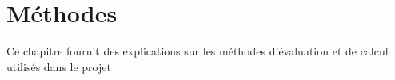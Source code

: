 \chapter{Méthodes}

Ce chapitre fournit des explications sur les méthodes d'évaluation et de calcul utilisés dans le projet 






